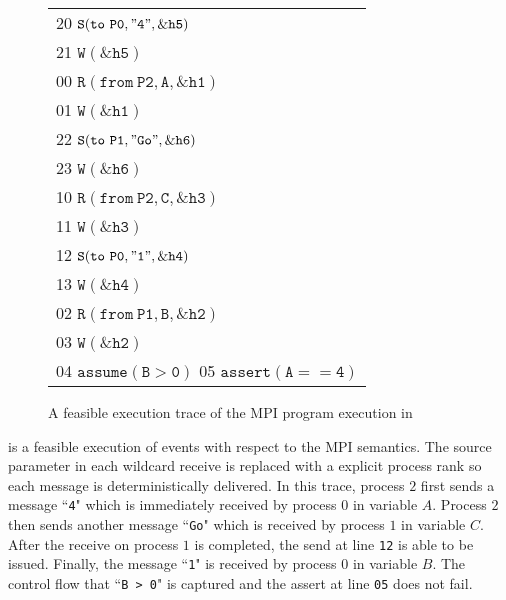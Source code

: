 \begin{figure}[b]
\begin{center}
\setlength{\tabcolsep}{2pt}
\small \begin{tabular}[t]{l}
20 $\mathtt{S(to\ P0, "4", \&h5)}$ \\
21 $\mathtt{W(\&h5)}$\\
\hline
00 $\mathtt{R(from\ P2, A, \&h1)}$ \\
01 $\mathtt{W(\&h1)}$ \\
\hline
22 $\mathtt{S(to\ P1, "Go", \&h6)}$ \\
23 $\mathtt{W(\&h6)}$ \\
\hline
10 $\mathtt{R(from\ P2, C, \&h3)}$ \\
11 $\mathtt{W(\&h3)}$ \\
12 $\mathtt{S(to\ P0, "1", \&h4)}$ \\
13 $\mathtt{W(\&h4)}$ \\
\hline
02 $\mathtt{R(from\ P1, B, \&h2)}$ \\
03 $\mathtt{W(\&h2)}$ \\
04 $\mathtt{assume(B > 0)}$
05 $\mathtt{assert(A == 4)}$ \\
\hline
\end{tabular}
\end{center}
\caption{A feasible execution trace of the MPI program execution in }
\label{fig:trace1}
\end{figure}

 is a feasible execution of events with respect to the MPI semantics. The source parameter in each wildcard receive is replaced with a explicit process rank so each message is deterministically delivered. In this trace, process $2$ first sends a message ``\texttt{4}" which is immediately received by process $0$ in variable $A$. Process $2$ then sends another message ``\texttt{Go}" which is received by process $1$ in variable $C$. After the receive on process $1$ is completed, the send at line \texttt{12} is able to be issued. Finally, the message ``\texttt{1}" is received by process $0$ in variable $B$. The control flow that ``\texttt{B > 0}" is captured and the assert at line \texttt{05} does not fail.

